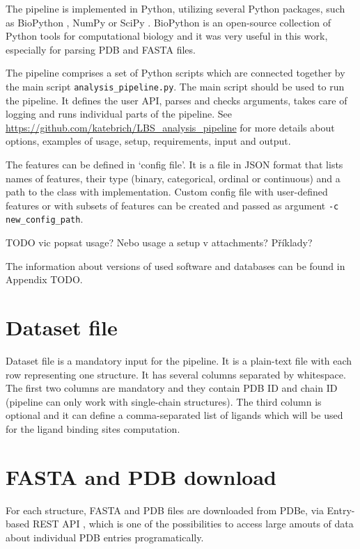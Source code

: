 The pipeline is implemented in Python, utilizing several Python packages, such as BioPython \cite{biopython}, NumPy \cite{numpy} or SciPy \cite{scipy}. BioPython is an open-source collection of Python tools for computational biology and it was very useful in this work, especially for parsing PDB and FASTA files.

The pipeline comprises a set of Python scripts which are connected together by the main script \texttt{analysis\_pipeline.py}. The main script should be used to run the pipeline. It defines the user API, parses and checks arguments, takes care of logging and runs individual parts of the pipeline. See \url{https://github.com/katebrich/LBS_analysis_pipeline} for more details about options, examples of usage, setup, requirements, input and output.

The features can be defined in `config file'. It is a file in JSON format that lists names of features, their type (binary, categorical, ordinal or continuous) and a path to the class with implementation. Custom config file with user-defined features or with subsets of features can be created and passed as argument \texttt{-c new\_config\_path}.

TODO vic popsat usage? Nebo usage a setup v attachments? Příklady?

The information about versions of used software and databases can be found in Appendix TODO. 


\section{Dataset file}
Dataset file is a mandatory input for the pipeline. It is a plain-text file with each row representing one structure. It has several columns separated by whitespace. The first two columns are mandatory and they contain PDB ID and chain ID (pipeline can only work with single-chain structures). The third column is optional and it can define a comma-separated list of ligands which will be used for the ligand binding sites computation.

\section{FASTA and PDB download}

For each structure, FASTA and PDB files are downloaded from PDBe, via Entry-based REST API \cite{pdbe_restapi}, which is one of the possibilities to access large amouts of data about individual PDB entries programatically.

